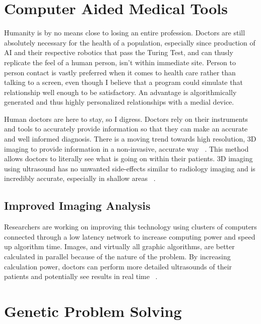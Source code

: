 \documentclass[11pt]{article}
\newcommand{\tab}{\hspace*{2em}}
\begin{document}
\begin{doublespace}
\section{Computer Aided Medical Tools}

\tab Humanity is by no means close to losing an entire profession. Doctors are still absolutely necessary for the health of 
a population, especially since production of AI and their respective robotics that pass the Turing Test, and can thusly replicate
the feel of a human person, isn't within immediate site. Person to person contact is vastly preferred when it comes to health
care rather than talking to a screen, even though I believe that a program could simulate that relationship well enough to be
satisfactory. An advantage is algorithmically generated and thus highly personalized relationships with a medial device.

\tab Human doctors are here to stay, so I digress. Doctors rely on their instruments and tools to accurately provide information
so that they can make an accurate and well informed diagnosis. There is a moving trend towards high resolution, 3D imaging to
provide information in a non-invasive, accurate way ~\cite{Zhang:2002:PPU:514191.514232}. This method allows doctors to 
literally see what is going on within their patients. 3D imaging using ultrasound has no unwanted side-effects similar to 
radiology imaging and is incredibly accurate, especially in shallow areas ~\cite{Zhang:2002:PPU:514191.514232}. 

\subsection{Improved Imaging Analysis}

\tab Researchers are working on improving this technology using clusters of computers connected through a low latency network
to increase computing power and speed up algorithm time. Images, and virtually all graphic algorithms, are better calculated
in parallel because of the nature of the problem. By increasing calculation power, doctors can perform more detailed ultrasounds
of their patients and potentially see results in real time ~\cite{Zhang:2002:PPU:514191.514232}. 

\section{Genetic Problem Solving}

\tab 


\end{doublespace}
\end{document}

